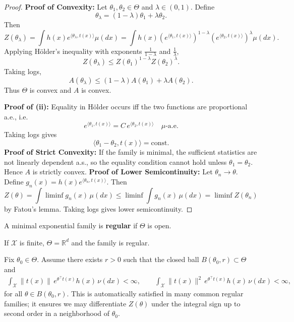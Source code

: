 \begin{proof}
    \textbf{Proof of Convexity:} Let $\theta_1,\theta_2\in\Theta$ and $\lambda\in(0,1)$. Define
\[
\theta_\lambda = (1-\lambda)\theta_1 + \lambda\theta_2.
\]
Then
\[
Z(\theta_\lambda)
= \int h(x)e^{\langle \theta_\lambda, t(x)\rangle}\mu(dx)
= \int h(x)\left(e^{\langle \theta_1,t(x)\rangle}\right)^{1-\lambda}
\left(e^{\langle \theta_2,t(x)\rangle}\right)^{\lambda}\mu(dx).
\]
Applying Hölder’s inequality with exponents $\frac{1}{1-\lambda}$ and $\frac{1}{\lambda}$,
\[
Z(\theta_\lambda)
\le Z(\theta_1)^{1-\lambda} Z(\theta_2)^{\lambda}.
\]
Taking logs,
\[
A(\theta_\lambda)
\le (1-\lambda)A(\theta_1) + \lambda A(\theta_2).
\]
Thus $\Theta$ is convex and $A$ is convex.

\textbf{Proof of (ii):} Equality in Hölder occurs iff the two functions are proportional a.e., i.e.
\[
e^{\langle \theta_1,t(x)\rangle} = C\, e^{\langle \theta_2,t(x)\rangle} \quad \mu\text{-a.e.}
\]
Taking logs gives
\[
\langle \theta_1-\theta_2, t(x)\rangle = \text{const.}
\]
\textbf{Proof of Strict Convexity:} If the family is minimal, the sufficient statistics are not linearly dependent a.s., so the equality condition cannot hold unless $\theta_1=\theta_2$. Hence $A$ is strictly convex.
\textbf{Proof of Lower Semicontinuity:} Let $\theta_n\to\theta$. Define $g_n(x)=h(x)e^{\langle \theta_n,t(x)\rangle}$. Then
\[
Z(\theta)=\int \liminf g_n(x)\,\mu(dx)
\le \liminf \int g_n(x)\,\mu(dx) = \liminf Z(\theta_n)
\]
by Fatou’s lemma. Taking logs gives lower semicontinuity.
\end{proof}

\begin{de}
A minimal exponential family is \textbf{regular} if $\Theta$ is open.
\end{de}
\begin{remark}
    If $\mathcal{X}$ is finite, $\Theta=\mathbb{R}^d$ and the family is regular.
\end{remark}

\begin{remark}
Fix $\theta_0\in\Theta$. Assume there exists $r>0$ such that the closed ball $B(\theta_0,r)\subset\Theta$ and
\begin{align}
\int_{\mathcal X} \|t(x)\|\, e^{\theta^\top t(x)} h(x)\,\nu(dx) < \infty,
\qquad
\int_{\mathcal X} \|t(x)\|^2\, e^{\theta^\top t(x)} h(x)\,\nu(dx) < \infty,
\label{eq:localmom}
\end{align}
for all $\theta\in B(\theta_0,r)$. This is automatically satisfied in many common regular families; it ensures
we may differentiate $Z(\theta)$ under the integral sign up to second order in a neighborhood of $\theta_0$.
\end{remark}


